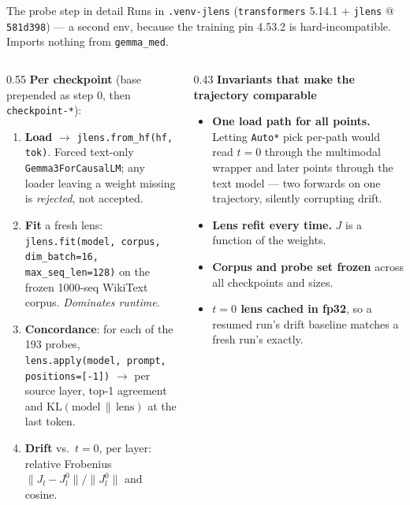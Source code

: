 \documentclass[aspectratio=169,10pt]{beamer}
\begin{document}
\begin{frame}{The probe step in detail}
  \small
  Runs in \texttt{.venv-jlens} (\texttt{transformers} 5.14.1 + \texttt{jlens}
  @ \texttt{581d398}) --- a second env, because the training pin 4.53.2 is
  hard-incompatible. Imports nothing from \texttt{gemma\_med}.

  \vspace{0.15em}
  \begin{columns}[T]
    \begin{column}{0.55\textwidth}
      \textbf{Per checkpoint} (base prepended as step 0, then
      \texttt{checkpoint-*}):
      \begin{enumerate}\setlength{\itemsep}{0em}
        \item \textbf{Load} $\rightarrow$ \texttt{jlens.from\_hf(hf, tok)}.
          Forced text-only \texttt{Gemma3ForCausalLM}; any loader leaving a
          weight missing is \emph{rejected}, not accepted.
        \item \textbf{Fit} a fresh lens: \texttt{jlens.fit(model, corpus,}
          \texttt{dim\_batch=16, max\_seq\_len=128)} on the frozen 1000-seq
          WikiText corpus. \emph{Dominates runtime.}
        \item \textbf{Concordance}: for each of the 193 probes,
          \texttt{lens.apply(model, prompt,} \texttt{positions=[-1])}
          $\rightarrow$ per source layer, top-1 agreement and
          $\mathrm{KL}(\text{model}\,\|\,\text{lens})$ at the last token.
        \item \textbf{Drift} vs.\ $t{=}0$, per layer: relative Frobenius
          $\|J_l - J_l^{0}\| / \|J_l^{0}\|$ and cosine.
      \end{enumerate}
    \end{column}
    \begin{column}{0.43\textwidth}
      \textbf{Invariants that make the trajectory comparable}
      \begin{itemize}\setlength{\itemsep}{0em}
        \item \textbf{One load path for all points.} Letting \texttt{Auto*}
          pick per-path would read $t{=}0$ through the multimodal wrapper and
          later points through the text model --- two forwards on one
          trajectory, silently corrupting drift.
        \item \textbf{Lens refit every time.} $J$ is a function of the weights.
        \item \textbf{Corpus and probe set frozen} across all checkpoints and
          sizes.
        \item \textbf{$t{=}0$ lens cached in fp32}, so a resumed run's drift
          baseline matches a fresh run's exactly.
      \end{itemize}
    \end{column}
  \end{columns}


\end{frame}
\end{document}
